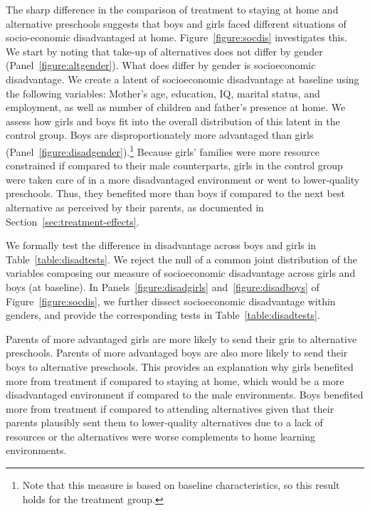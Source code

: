 The sharp difference in the comparison of treatment to staying at home and alternative preschools suggests that boys and girls faced different situations of socio-economic disadvantaged at home. Figure~\ref{figure:socdis} investigates this. We start by noting that take-up of alternatives does not differ by gender (Panel~\ref{figure:altgender}). What does differ by gender is socioeconomic disadvantage. We create a latent of socioeconomic disadvantage at baseline using the following variables: Mother's age, education, IQ, marital status, and employment, as well as number of children and father's presence at home. We assess how girls and boys fit into the overall distribution of this latent in the control group. Boys are disproportionately more advantaged than girls (Panel~\ref{figure:disadgender}).\footnote{Note that this measure is based on baseline characteristics, so this result holds for the treatment group.} Because girls' families were more resource constrained if compared to their male counterparts, girls in the control group were taken care of in a more disadvantaged environment or went to lower-quality preschools. Thus, they benefited more than boys if compared to the next best alternative as perceived by their parents, as documented in Section~\ref{sec:treatment-effects}.

We formally test the difference in disadvantage across boys and girls in Table~\ref{table:disadtests}. We reject the null of a common joint distribution of the variables composing our measure of socioeconomic disadvantage across girls and boys (at baseline). In Panels~\ref{figure:disadgirls} and~\ref{figure:disadboys} of Figure~\ref{figure:socdis}, we further dissect socioeconomic disadvantage within genders, and provide the corresponding tests in Table~\ref{table:disadtests}. 

Parents of more advantaged girls are more likely to send their gris to alternative preschools. Parents of more advantaged boys are also more likely to send their boys to alternative preschools. This provides an explanation why girls benefited more from treatment if compared to staying at home, which would be a more disadvantaged environment if compared to the male environments. Boys benefited more from treatment if compared to attending alternatives given that their parents plausibly sent them to lower-quality alternatives due to a lack of resources or the alternatives were worse complements to home learning environments. 

